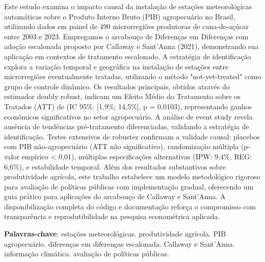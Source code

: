 \documentclass[
	12pt,				%
	oneside,			%
	a4paper,			%
	english,			%
	french,				%
	spanish,			%
	brazil				%
	]{abntex2}
\begin{document}
\setlength{\absparsep}{18pt} %
\begin{resumo}
Este estudo examina o impacto causal da instalação de estações meteorológicas automáticas sobre o Produto Interno Bruto (PIB) agropecuário no Brasil, utilizando dados em painel de 490 microrregiões produtoras de cana-de-açúcar entre 2003 e 2023. Empregamos o arcabouço de Diferenças em Diferenças com adoção escalonada proposto por Callaway e Sant'Anna (2021), demonstrando sua aplicação em contextos de tratamento escalonado. A estratégia de identificação explora a variação temporal e geográfica na instalação de estações entre microrregiões eventualmente tratadas, utilizando o método "not-yet-treated" como grupo de controle dinâmico. Os resultados principais, obtidos através do estimador doubly robust, indicam um Efeito Médio do Tratamento sobre os Tratados (ATT) de \mainattpct{} (IC 95\%: [1,9\%; 14,5\%], p = 0,0103), representando ganhos econômicos significativos no setor agropecuário. A análise de event study revela ausência de tendências pré-tratamento diferenciadas, validando a estratégia de identificação. Testes extensivos de robustez confirmam a validade causal: placebos com PIB não-agropecuário (ATT não significativo), randomização múltipla (p-valor empírico < 0,01), múltiplas especificações alternativas (IPW: 9,4\%, REG: 6,6\%), e estabilidade temporal. Além dos resultados substantivos sobre produtividade agrícola, este trabalho estabelece um modelo metodológico rigoroso para avaliação de políticas públicas com implementação gradual, oferecendo um guia prático para aplicações do arcabouço de Callaway e Sant'Anna. A disponibilização completa do código e documentação reforça o compromisso com transparência e reprodutibilidade na pesquisa econométrica aplicada.

 \textbf{Palavras-chave}: estações meteorológicas. produtividade agrícola. PIB agropecuário. diferenças em diferenças escalonada. Callaway e Sant'Anna. informação climática. avaliação de políticas públicas.
\end{resumo}
\end{document}
